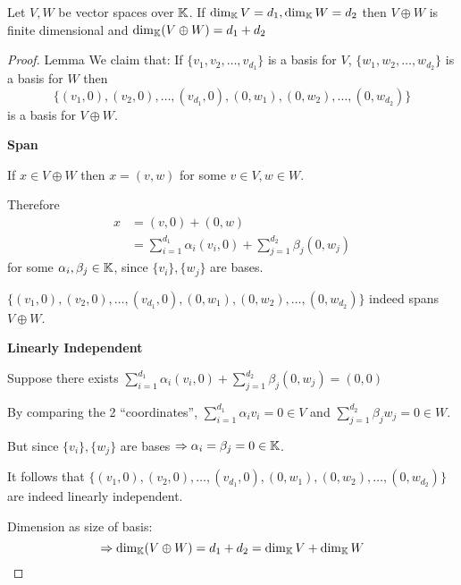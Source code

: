 
\begin{lemma}
    Let \(V, W\) be vector spaces over \(\mathbb{K}\). If \(\dim_{\mathbb{K}} V = d_1, \dim_{\mathbb{K}} W = d_2\) then \(V \oplus W\) is finite dimensional and \(\dim_{\mathbb{K}} (V \oplus W) = d_1 + d_2\)
\end{lemma}
\begin{proof} {Lemma}
    We claim that: If \(\{v_1, v_2, \dots, v_{d_1}\}\) is a basis for \(V\),  \(\{w_1, w_2, \dots, w_{d_2}\}\) is a basis for \(W\) then \[
    \{(v_1, 0), (v_2, 0), \dots, (v_{d_1}, 0), (0, w_1), (0, w_2), \dots, (0, w_{d_2})\}
    \]
    is a basis for \(V \oplus W\).

    \textbf{Span}

    If \(x \in V \oplus W\) then \(x = (v, w)\) for some \(v \in V, w \in W\).

    Therefore
    \begin{align*}
        x &= (v, 0) + (0, w)\\
        &= \sum_{i=1}^{d_1}\alpha_i(v_i, 0) + \sum_{j=1}^{d_2}\beta_j (0, w_j)
    \end{align*}
    for some \(\alpha_i, \beta_j \in \mathbb{K}\), since \(\{v_i\}, \{w_j\}\) are bases.

    \(\{(v_1, 0), (v_2, 0), \dots, (v_{d_1}, 0), (0, w_1), (0, w_2), \dots, (0, w_{d_2})\}\) indeed spans \(V \oplus W\).

    \textbf{Linearly Independent}

    Suppose there exists \(\sum_{i=1}^{d_1}\alpha_i(v_i, 0) + \sum_{j=1}^{d_2}\beta_j (0, w_j) = (0, 0)\)

    By comparing the 2 ``coordinates'', \(\sum_{i=1}^{d_1}\alpha_i v_i =0 \in V\) and \(\sum_{j=1}^{d_2}\beta_j w_j =0 \in W\).

    But since \(\{v_i\}, \{w_j\}\) are bases \(\Rightarrow \alpha_i = \beta_j = 0 \in \mathbb{K}\). 
    
    It follows that  \(\{(v_1, 0), (v_2, 0), \dots, (v_{d_1}, 0), (0, w_1), (0, w_2), \dots, (0, w_{d_2})\}\) are indeed linearly independent.

    Dimension as size of basis:
    \[
    \Rightarrow \dim_{\mathbb{K}}(V \oplus W) = d_1 + d_2 = \dim_{\mathbb{K}} V + \dim_{\mathbb{K}} W
    \]
\end{proof}

